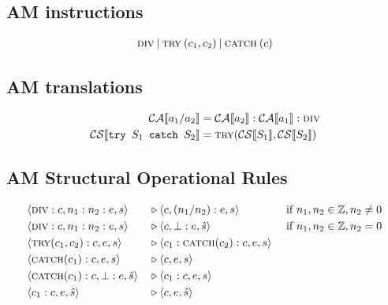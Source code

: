 \documentclass[11pt,oneside,a4paper]{article}
\newcommand{\SExp}[2]{\mathcal{#1}\llbracket #2 \rrbracket}
\newcommand{\AMIns}[1]{\textsc{#1}}
\newcommand{\AMConf}[3]{\langle #1, #2, #3 \rangle}
\newcommand{\AMArrow}{\: &\triangleright&\:}
\begin{document}
\subsection*{AM instructions}
\begin{align*}
\AMIns{div}\: |\: \AMIns{try}\:(c_1,c_2)\: |\: \AMIns{catch}\:(c)
\end{align*}

\subsection*{AM translations}
\begin{align*}
\SExp{CA}{a_1 / a_2} &= 
    \SExp{CA}{a_2}:\SExp{CA}{a_1}:\AMIns{div} \\
\SExp{CS}{\texttt{try } S_1  \texttt{ catch } S_2} &= 
    \AMIns{try}(\SExp{CS}{S_1}, \SExp{CS}{S_2})
\end{align*}

\subsection*{AM Structural Operational Rules}
\begingroup
\addtolength{\jot}{.5em}
\begin{align*}
&\AMConf{\AMIns{div}:c}{n_1:n_2:e}{s} \AMArrow
\AMConf{c}{(n_1 / n_2):e}{s}& \text{ if } 
n_1, n_2 \in \mathbb{Z}, n_2 \neq 0 \\
&\AMConf{\AMIns{div}:c}{n_1:n_2:e}{s} \AMArrow
\AMConf{c}{\bot:e}{\hat{s}}& \text{ if }
n_1, n_2 \in \mathbb{Z}, n_2 = 0 \\
&\AMConf{\AMIns{try}(c_1, c_2):c}{e}{s} \AMArrow
\AMConf{c_1:\AMIns{catch}(c_2):c}{e}{s}& \\
&\AMConf{\AMIns{catch}(c_1):c}{e}{s} \AMArrow
\AMConf{c}{e}{s}& \\
&\AMConf{\AMIns{catch}(c_1):c}{\bot:e}{\hat{s}} \AMArrow
\AMConf{c_1:c}{e}{s}& \\
&\AMConf{c_1:c}{e}{\hat{s}} \AMArrow \AMConf{c}{e}{\hat{s}}
\end{align*}
\endgroup
\end{document}
